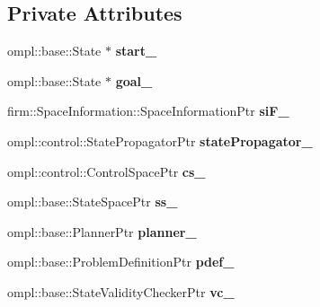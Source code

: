 \subsection*{Private Attributes}
\begin{DoxyCompactItemize}
\item 
\hypertarget{class_multi_modal_setup_a2cd763b4f36e35ff5b2a149a3ba807a5}{ompl\-::base\-::\-State $\ast$ {\bfseries start\-\_\-}}\label{class_multi_modal_setup_a2cd763b4f36e35ff5b2a149a3ba807a5}

\item 
\hypertarget{class_multi_modal_setup_a99b9f5ecde62a272c9bf4d2cf893864a}{ompl\-::base\-::\-State $\ast$ {\bfseries goal\-\_\-}}\label{class_multi_modal_setup_a99b9f5ecde62a272c9bf4d2cf893864a}

\item 
\hypertarget{class_multi_modal_setup_a23abac6c94ba020c29ebf02d5a8d0bc0}{firm\-::\-Space\-Information\-::\-Space\-Information\-Ptr {\bfseries si\-F\-\_\-}}\label{class_multi_modal_setup_a23abac6c94ba020c29ebf02d5a8d0bc0}

\item 
\hypertarget{class_multi_modal_setup_ab9a1e2637d9c9c9d3c7698edb6d5b275}{ompl\-::control\-::\-State\-Propagator\-Ptr {\bfseries state\-Propagator\-\_\-}}\label{class_multi_modal_setup_ab9a1e2637d9c9c9d3c7698edb6d5b275}

\item 
\hypertarget{class_multi_modal_setup_a8616d2e2bb41b6f567219d0048d03c3d}{ompl\-::control\-::\-Control\-Space\-Ptr {\bfseries cs\-\_\-}}\label{class_multi_modal_setup_a8616d2e2bb41b6f567219d0048d03c3d}

\item 
\hypertarget{class_multi_modal_setup_ac54df533e3dda63c60949964e8f74b2e}{ompl\-::base\-::\-State\-Space\-Ptr {\bfseries ss\-\_\-}}\label{class_multi_modal_setup_ac54df533e3dda63c60949964e8f74b2e}

\item 
\hypertarget{class_multi_modal_setup_a34aa1f088a5091312e66a0f5f69d47ab}{ompl\-::base\-::\-Planner\-Ptr {\bfseries planner\-\_\-}}\label{class_multi_modal_setup_a34aa1f088a5091312e66a0f5f69d47ab}

\item 
\hypertarget{class_multi_modal_setup_add096110ff806ca73c7c61052f5db3f0}{ompl\-::base\-::\-Problem\-Definition\-Ptr {\bfseries pdef\-\_\-}}\label{class_multi_modal_setup_add096110ff806ca73c7c61052f5db3f0}

\item 
\hypertarget{class_multi_modal_setup_a77e009c3b72d1ac12c6dba998e9ff7a0}{ompl\-::base\-::\-State\-Validity\-Checker\-Ptr {\bfseries vc\-\_\-}}\label{class_multi_modal_setup_a77e009c3b72d1ac12c6dba998e9ff7a0}


\end{DoxyCompactItemize}
